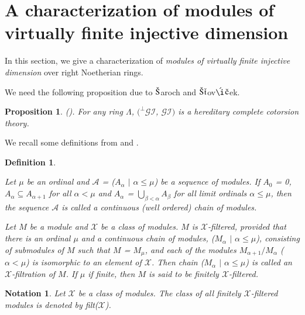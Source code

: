 \documentclass[11pt,a4paper]{article}
\newtheorem{prop}[thm]{Proposition}
\newtheorem{defn}[thm]{Definition}
\newtheorem{nota}[thm]{Notation}
\begin{document}
\medskip

\section{A characterization of    modules of  virtually finite  injective
  dimension}



In this section, we   give a characterization of  {\it modules of  virtually finite  injective
  dimension} \cite{bel} over  right Noetherian rings.


We need   the following    proposition  due to $\check{\rm S}$aroch and $\check{\rm S}$$\check{\rm t}$ov$\acute{\rm {\i}}$$\check{\rm c}$ek.
\begin{prop}\label{prop1} {\rm (\cite[Theorem 5.6]{ss})}. For any ring $\Lambda$, $(^\perp\mathscr{GI}$, $\mathscr{GI})$ is a hereditary complete
  cotorsion theory.   \end{prop}

We recall some definitions from \cite{eno5} and \cite{gbe}.

 \begin{defn} \label{defn2} \rm{Let $\mu$ be an ordinal and $\mathscr{A}$ = ($A_{\alpha} $ $|$ $\alpha \leq \mu$) be a sequence of modules.
  If $A_{0} $ = 0,  $A_{\alpha} \subseteq  A_{\alpha + 1}$ for all $\alpha < \mu$ and   $A_{\alpha} $ = $\bigcup_{\beta < \alpha} A_{\beta} $ for all
 limit ordinals $\alpha \leq \mu$, then the sequence $\mathscr{A}$  is called a {\it continuous {\rm (}well ordered{\rm )} chain of modules.}

   Let $M$ be a module and $\mathscr{X}$ be a class of modules. $M$ is  $\mathscr{X}$-{\it filtered}, provided that there is an ordinal $\mu$
   and  a continuous chain of modules, ($M_{\alpha} $ $|$ $\alpha \leq \mu$), consisting of submodules of $M$ such that $M$ = $M_{\mu} $,
    and each of the modules $M_{\alpha + 1}/M_{\alpha}  $  ($\alpha < \mu$) is isomorphic to an element of $\mathscr{X}$. Then chain ($M_{\alpha} $ $|$ $\alpha \leq \mu$)
   is called an $\mathscr{X}$-{\it filtration} of $M$. If $\mu$ if finite, then  $M$ is said to be {\it finitely} $\mathscr{X}$-{\it filtered}.}\end{defn}


\begin{nota}\label{nota11}  {\rm   Let   $\mathscr{X}$ be a class of modules. The class of all finitely  $\mathscr{X}$-filtered modules is denoted by
 filt($\mathscr{X}$)}.
\end{nota}
\end{document}
